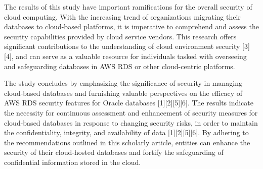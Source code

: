 \documentclass{ieee}
\begin{document}

The results of this study have important ramifications for the overall security of cloud computing. With the increasing trend of organizations migrating their databases to cloud-based platforms, it is imperative to comprehend and assess the security capabilities provided by cloud service vendors. This research offers significant contributions to the understanding of cloud environment security [3][4], and can serve as a valuable resource for individuals tasked with overseeing and safeguarding databases in AWS RDS or other cloud-centric platforms.


The study concludes by emphasizing the significance of security in managing cloud-based databases and furnishing valuable perspectives on the efficacy of AWS RDS security features for Oracle databases [1][2][5][6]. The results indicate the necessity for continuous assessment and enhancement of security measures for cloud-based databases in response to changing security risks, in order to maintain the confidentiality, integrity, and availability of data [1][2][5][6]. By adhering to the recommendations outlined in this scholarly article, entities can enhance the security of their cloud-hosted databases and fortify the safeguarding of confidential information stored in the cloud.
\end{document}
